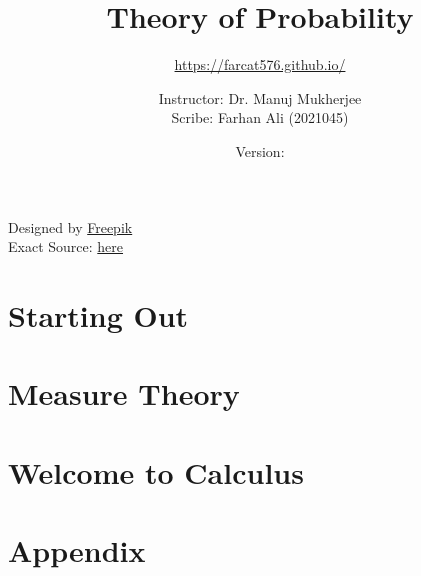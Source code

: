\documentclass[11pt,twoside=semi,openright,numbers=noenddot,titlepage=false]{scrbook}
\title{Theory of Probability}
\subtitle{\url{https://farcat576.github.io/}}
\author{Instructor: Dr. Manuj Mukherjee \\ Scribe: Farhan Ali (2021045)}
\date{Version: \napkinversion}
\begin{document}
\frontmatter
\maketitle

\bgroup
\fboxrule=4pt
\noindent{}
\begin{center}
	Designed by \href{www.freepik.com}{Freepik} \\
	Exact Source: \href{https://www.freepik.com/free-photo/closeup-abstract-watercolor-background_2768350.htm#fromView=image_search&page=1&position=24&uuid=895fbb9c-0a69-4bd5-ac86-3b253fd9093b}{here}
\end{center}
\egroup
\newpage




\setcounter{chapter}{-1} %


\cleardoublepage
{}
\setcounter{temppage}{\value{page}}
\mainmatter
\setcounter{page}{\value{temppage}}

\tableofcontents


\part{Starting Out}
\label{part:startout}
\parttoc
\setcounter{chapter}{-1} %


\part{Measure Theory}
\label{part:measure}
\parttoc

\part{Welcome to Calculus}
\label{part:calc}
\parttoc

\part{Appendix}
\parttoc
\appendix







\backmatter

\clearpage
\printbibliography[type=image,title={Image Attributions}]
\printbibliography[nottype=image]
\end{document}

